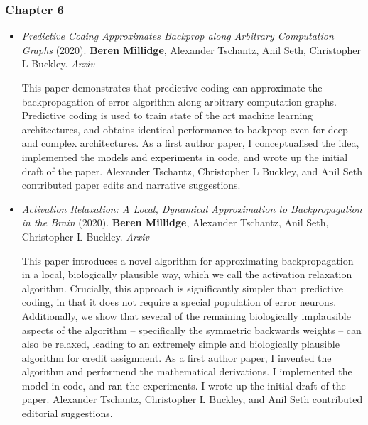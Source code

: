 \subsubsection{Chapter 6}

\begin{itemize}



\item \emph{Predictive Coding Approximates Backprop along Arbitrary Computation Graphs} (2020). \textbf{Beren Millidge}, Alexander Tschantz, Anil Seth, Christopher L Buckley. \emph{Arxiv}

This paper demonstrates that predictive coding can approximate the backpropagation of error algorithm along arbitrary computation graphs. Predictive coding is used to train state of the art machine learning architectures, and obtains identical performance to backprop even for deep and complex architectures. As a first author paper, I conceptualised the idea, implemented the models and experiments in code, and wrote up the initial draft of the paper. Alexander Tschantz, Christopher L Buckley, and Anil Seth contributed paper edits and narrative suggestions.

\item \emph{Activation Relaxation: A Local, Dynamical Approximation to Backpropagation in the Brain} (2020). \textbf{Beren Millidge}, Alexander Tschantz, Anil Seth, Christopher L Buckley. \emph{Arxiv}

This paper introduces a novel algorithm for approximating backpropagation in a local, biologically plausible way, which we call the activation relaxation algorithm. Crucially, this approach is significantly simpler than predictive coding, in that it does not require a special population of error neurons. Additionally, we show that several of the remaining biologically implausible aspects of the algorithm -- specifically the symmetric backwards weights -- can also be relaxed, leading to an extremely simple and biologically plausible algorithm for credit assignment. As a first author paper, I invented the algorithm and performend the mathematical derivations. I implemented the model in code, and ran the experiments. I wrote up the initial draft of the paper. Alexander Tschantz, Christopher L Buckley, and Anil Seth contributed editorial suggestions.


\end{itemize}
